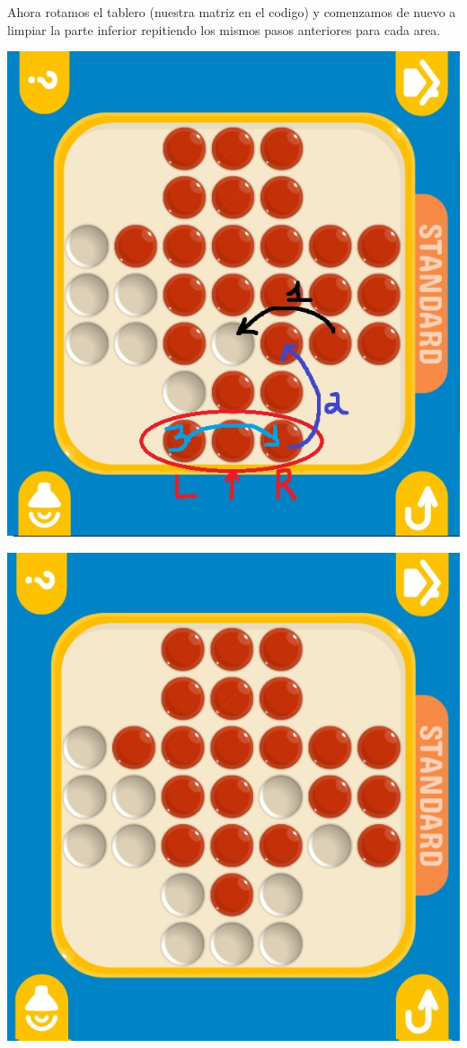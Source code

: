 \documentclass[10pt,a4paper]{report}
\begin{document}
\pagebreak
Ahora rotamos el tablero (nuestra matriz en el codigo) y comenzamos de nuevo a limpiar la parte inferior repitiendo los mismos pasos anteriores para cada area.

\begin{center}
	\includegraphics[scale=.3]{10.jpg} \hspace{6cm}
	
	\includegraphics[scale=.3]{11.jpg} \hspace{6cm}
	

\end{center}
\end{document}
